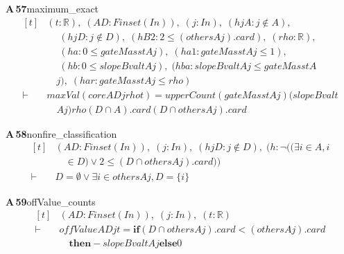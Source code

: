 \documentclass[conference]{IEEEtran}
\theoremstyle{definition}
\newcommand{\lean}[1]{\textsf{\footnotesize #1}}
\begin{document}
\noindent\textbf{A\,57}\quad\lean{maximum\_exact}
{\footnotesize\[ \begin{aligned}[t]
&(\mathit{t} : \mathbb{R} ),\; (\mathit{A} \mathit{D} : \mathit{Finset} (\mathit{I} \mathit{n})),\; (\mathit{j} : \mathit{I} \mathit{n}),\; (\mathit{hjA} : \mathit{j} \notin \mathit{A}),\\
&\quad \; (\mathit{hjD} : \mathit{j} \notin \mathit{D}),\; (\mathit{hB2} : 2 \leq (\mathit{others} \mathit{A} \mathit{j}).\mathit{card}),\; (\mathit{rho} : \mathbb{R} ),\\
&\quad \; (\mathit{ha} : 0 \leq \mathit{gateMass} \mathit{t} \mathit{A} \mathit{j}),\; (\mathit{ha1} : \mathit{gateMass} \mathit{t} \mathit{A} \mathit{j} \leq 1),\\
&\quad \; (\mathit{hb} : 0 \leq \mathit{slopeBval} \mathit{t} \mathit{A} \mathit{j}),\; (\mathit{hba} : \mathit{slopeBval} \mathit{t} \mathit{A} \mathit{j} \leq \mathit{gateMass} \mathit{t} \mathit{A}\\
&\quad \mathit{j}),\; (\mathit{har} : \mathit{gateMass} \mathit{t} \mathit{A} \mathit{j} \leq \mathit{rho})\\
\vdash\;&\mathit{maxVal} (\mathit{core} \mathit{A} \mathit{D} \mathit{j} \mathit{rho} \mathit{t}) = \mathit{upperCount} (\mathit{gateMass} \mathit{t} \mathit{A} \mathit{j}) (\mathit{slopeBval} \mathit{t}\\
&\quad \mathit{A} \mathit{j}) \mathit{rho} (\mathit{D} \cap \mathit{A}).\mathit{card} (\mathit{D} \cap \mathit{others} \mathit{A} \mathit{j}).\mathit{card}
\end{aligned} \]}

\noindent\textbf{A\,58}\quad\lean{nonfire\_classification}
{\footnotesize\[ \begin{aligned}[t]
&(\mathit{A} \mathit{D} : \mathit{Finset} (\mathit{I} \mathit{n})),\; (\mathit{j} : \mathit{I} \mathit{n}),\; (\mathit{hjD} : \mathit{j} \notin \mathit{D}),\; (\mathit{h} : \neg ((\exists \mathit{i} \in \mathit{A}, \mathit{i}\\
&\quad \in \mathit{D}) \vee 2 \leq (\mathit{D} \cap \mathit{others} \mathit{A} \mathit{j}).\mathit{card}))\\
\vdash\;&\mathit{D} = \emptyset \vee \exists \mathit{i} \in \mathit{others} \mathit{A} \mathit{j}, \mathit{D} = \{ \mathit{i}\}
\end{aligned} \]}

\noindent\textbf{A\,59}\quad\lean{offValue\_counts}
{\footnotesize\[ \begin{aligned}[t]
&(\mathit{A} \mathit{D} : \mathit{Finset} (\mathit{I} \mathit{n})),\; (\mathit{j} : \mathit{I} \mathit{n}),\; (\mathit{t} : \mathbb{R} )\\
\vdash\;&\mathit{offValue} \mathit{A} \mathit{D} \mathit{j} \mathit{t} = \mathbf{if} (\mathit{D} \cap \mathit{others} \mathit{A} \mathit{j}).\mathit{card} < (\mathit{others} \mathit{A} \mathit{j}).\mathit{card}\\
&\quad \mathbf{then} -\mathit{slopeBval} \mathit{t} \mathit{A} \mathit{j} \mathbf{else} 0
\end{aligned} \]}
\end{document}
